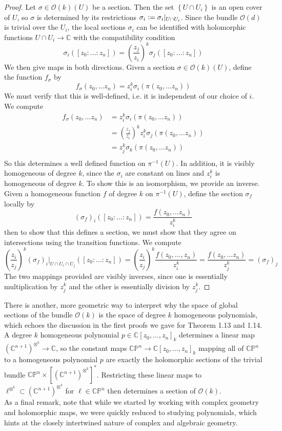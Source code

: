 \documentclass[psamsfonts, 12pt]{amsart}
\theoremstyle{definition}
\theoremstyle{remark}
\renewcommand{\O}{\mathcal{O}}
\newcommand{\C}{\mathbb{C}}
\newcommand{\CP}{\mathbb{CP}}
\newcommand{\inv}{^{-1}}
\newcommand{\set}[1]{\left\lbrace #1 \right\rbrace}
\newcommand{\defeq}{\vcentcolon=}
\begin{document}
\begin{proof}
Let $\sigma \in \O(k)(U)$ be a section. Then the set $\set{U \cap U_i}$ is an
open cover of $U$, so $\sigma$ is determined by its restrictions
$\sigma_i \defeq \sigma_i\vert_{U \cap U_i}$. Since the bundle $\O(d)$ is trivial
over the $U_i$, the local sections $\sigma_i$ can be identified with holomorphic
functions $U \cap U_i \to \C$ with the compatibility condition
\[
\sigma_i([z_0 :\ldots : z_n])
= \left(\frac{z_j}{z_i}\right)^k\sigma_j([z_0: \ldots : z_n])
\]
We then give maps in both directions. Given a section
$\sigma \in \O(k)(U)$, define the function $f_\sigma$ by
\[
f_\sigma(z_0,\ldots z_n) = z_i^k\sigma_i(\pi(z_0,\ldots z_n))
\]
We must verify that this is well-defined, i.e. it is independent of our choice of $i$.
We compute
\begin{align*}
f_\sigma(z_0,\ldots z_n)
&=  z_i^k\sigma_i(\pi(z_0,\ldots z_n)) \\
&=  \left(\frac{z_j}{z_i}\right)^kz_i^k\sigma_j(\pi(z_0,\ldots z_n)) \\
&= z_j^k\sigma_k(\pi(z_0, \ldots z_n)) \\
\end{align*}
So this determines a well defined function on $\pi\inv(U)$. In addition, it is
visibly homogeneous of degree $k$, since the $\sigma_i$ are constant on lines and
$z_i^k$ is homogeneous of degree $k$. To show this is an isomorphism, we provide
an inverse. Given a homogeneous function $f$ of degree $k$ on $\pi\inv(U)$, define
the section $\sigma_f$ locally by
\[
(\sigma_f)_i([z_0: \ldots :z_n]) = \frac{f(z_0,\ldots z_n)}{z_i^k}
\]
then to show that this defines a section, we must show that they agree on intersections
using the transition functions. We compute
\[
\left(\frac{z_i}{z_j}\right)^k(\sigma_f)_i\vert_{U \cap U_i \cap U_j}([z_0: \ldots : z_n])
= \left(\frac{z_i}{z_j}\right)^k\frac{f(z_0,\ldots, z_n)}{z_i^k}
= \frac{f(z_0, \ldots z_n)}{z_j^k}
= (\sigma_f)_j
\]
The two mappings provided are visibly inverses, since one is essentially multiplication
by $z_j^k$ and the other is essentially division by $z_j^k$.
\end{proof}
%
There is another, more geometric way to interpret why the space of global sections of
the bundle $\O(k)$ is the space of degree $k$ homogeneous polynomials, which
echoes the discussion in the first proofs we gave for Theorem 1.13 and 1.14.
A degree $k$ homogeneous polynomial $p \in \C[z_0,\ldots,z_n]_k$ determines
a linear map $(\C^{n+1})^{\otimes^k} \to \C$, so the
constant maps $\CP^n \to \C[z_0,\ldots,z_n]_k$ mapping all of $\CP^n$ to a
homogeneous polynomial $p$ are exactly the holomorphic sections of the
trivial bundle $\CP^n \times [(\C^{n+1})^{\otimes^k}]^*$. Restricting
these linear maps to $\ell^{\otimes^k} \subset (\C^{n+1})^{\otimes^k}$ for
$\ell \in \CP^n$ then determines a section of $\O(k)$. \\

As a final remark, note that while we started by working with complex geometry
and holomorphic maps, we were quickly reduced to studying polynomials, which
hints at the closely intertwined nature of complex and algebraic geometry.
%
\end{document}
